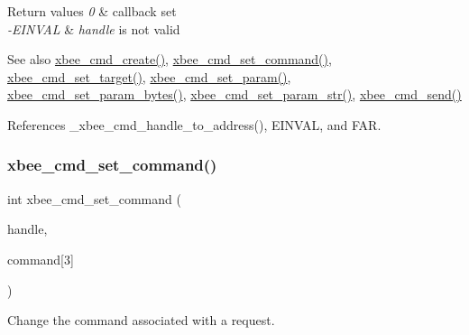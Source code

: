 \begin{DoxyRetVals}{Return values}
{\em 0} & callback set \\
\hline
{\em -\/\+E\+I\+N\+V\+AL} & {\itshape handle} is not valid\\
\hline
\end{DoxyRetVals}
\begin{DoxySeeAlso}{See also}
\hyperlink{group__xbee__atcmd_gab73aaf873be6f9e515dcd65748a7f21c}{xbee\+\_\+cmd\+\_\+create()}, \hyperlink{group__xbee__atcmd_ga06181e54a87d90c30108360d6b433323}{xbee\+\_\+cmd\+\_\+set\+\_\+command()}, \hyperlink{group__xbee__atcmd_gae478cb2ea9bb07ade86009a65e6d121f}{xbee\+\_\+cmd\+\_\+set\+\_\+target()}, \hyperlink{group__xbee__atcmd_ga4295dde3673b07f41e569e333abd9730}{xbee\+\_\+cmd\+\_\+set\+\_\+param()}, \hyperlink{group__xbee__atcmd_ga6bd558a2d03eafe29b176f598d76ffd6}{xbee\+\_\+cmd\+\_\+set\+\_\+param\+\_\+bytes()}, \hyperlink{group__xbee__atcmd_ga5b69459e7c47be384c9add2921e507e0}{xbee\+\_\+cmd\+\_\+set\+\_\+param\+\_\+str()}, \hyperlink{group__xbee__atcmd_ga2c58eedef60b41dd30ae1f6b475606a8}{xbee\+\_\+cmd\+\_\+send()} 
\end{DoxySeeAlso}


References \+\_\+xbee\+\_\+cmd\+\_\+handle\+\_\+to\+\_\+address(), E\+I\+N\+V\+AL, and F\+AR.

\mbox{\label{group__xbee__atcmd_ga06181e54a87d90c30108360d6b433323}} 
\subsubsection{\texorpdfstring{xbee\+\_\+cmd\+\_\+set\+\_\+command()}{xbee\_cmd\_set\_command()}}
{\footnotesize\ttfamily int xbee\+\_\+cmd\+\_\+set\+\_\+command (\begin{DoxyParamCaption}\item[{\hyperlink{group__hal__dos_ga2140805d08462d474b82ddc8d1c2f3e6}{int16\+\_\+t}}]{handle,  }\item[{const char \hyperlink{group__hal_gaef060b3456fdcc093a7210a762d5f2ed}{F\+AR}}]{command\mbox{[}3\mbox{]} }\end{DoxyParamCaption})}



Change the command associated with a request. 


